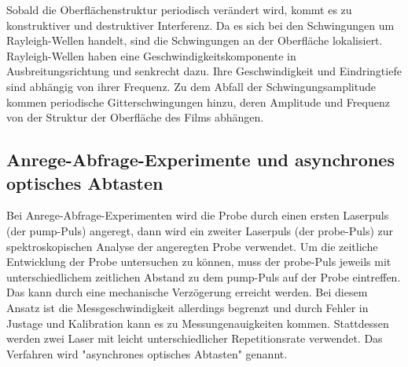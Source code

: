 Sobald die Oberflächenstruktur periodisch verändert wird, kommt es zu konstruktiver und destruktiver Interferenz. Da es sich bei den Schwingungen um Rayleigh-Wellen handelt, sind die Schwingungen an der Oberfläche lokalisiert. Rayleigh-Wellen haben eine Geschwindigkeitskomponente in Ausbreitungsrichtung und senkrecht dazu. Ihre Geschwindigkeit und Eindringtiefe sind abhängig von ihrer Frequenz. Zu dem Abfall der Schwingungsamplitude kommen periodische Gitterschwingungen hinzu, deren Amplitude und Frequenz von der Struktur der Oberfläche des Films abhängen.


\subsection{Anrege-Abfrage-Experimente und asynchrones optisches Abtasten}

Bei Anrege-Abfrage-Experimenten wird die Probe durch einen ersten Laserpuls (der pump-Puls) angeregt, dann wird ein zweiter Laserpuls (der probe-Puls) zur spektroskopischen Analyse der angeregten Probe verwendet. Um die zeitliche Entwicklung der Probe untersuchen zu können, muss der probe-Puls jeweils mit unterschiedlichem zeitlichen Abstand zu dem pump-Puls auf der Probe eintreffen. Das kann durch eine mechanische Verzögerung erreicht werden. Bei diesem Ansatz ist die Messgeschwindigkeit allerdings begrenzt und durch Fehler in Justage und Kalibration kann es zu Messungenauigkeiten kommen. Stattdessen werden zwei Laser mit leicht unterschiedlicher Repetitionsrate verwendet. Das Verfahren wird "asynchrones optisches Abtasten" genannt.
